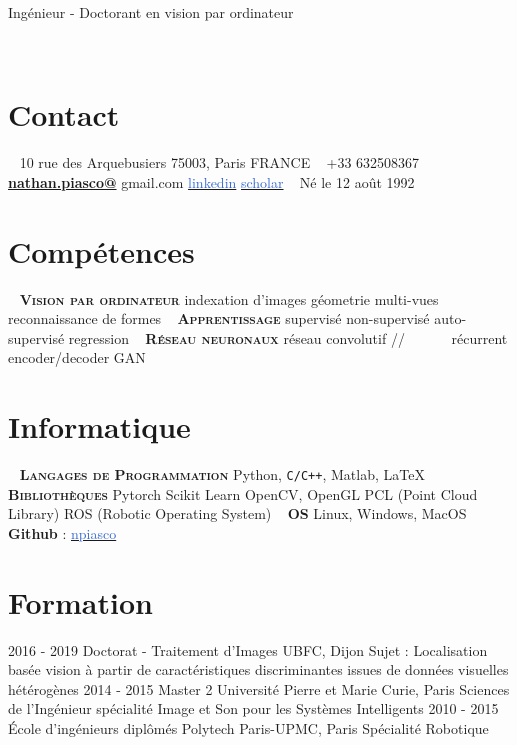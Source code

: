 \documentclass[]{friggeri-cv-cust}
\begin{document}
      {Ingénieur - Doctorant en vision par ordinateur}
      
\vspace{10pt}
\vspace{1pt}

\begin{aside}
  ~
  \section{Contact}
    ~
    10 rue des Arquebusiers
    75003, Paris
    FRANCE
    ~
    +33 632508367
    ~
   	\href{mailto:nathan.piasco@gmail.com}{\textbf{nathan.piasco@}}
   	gmail.com
	{\href{https://www.linkedin.com/in/nathan-piasco-a4766aa5/}{\textcolor{highlight}{linkedin}}}
	{\href{https://scholar.google.fr/citations?user=S3zYmOYAAAAJ&hl=fr}{\textcolor{highlight}{scholar}}}
	~
    Né le 12 août 1992
    ~    
  \section{Compétences}
    ~
    \textbf{\small{\textsc{Vision par ordinateur}}}
    indexation d'images
    géometrie multi-vues
    reconnaissance de formes
    ~    
    \textbf{\small{\textsc{Apprentissage}}}
    supervisé
    non-supervisé
    auto-supervisé
    regression
    ~    
    \textbf{\small{\textsc{Réseau neuronaux}}}
    réseau convolutif
    //~~~~~~ récurrent
    encoder/decoder
    GAN
    ~    
  \section{Informatique}
    ~  
    \textbf{\textsc{\textsc{Langages de Programmation}}}
    Python, \texttt{C/C++},
    Matlab,  \LaTeX
    ~
    \textbf{\textsc{Bibliothèques}}
    Pytorch
    Scikit Learn
	OpenCV, OpenGL
    PCL (Point Cloud Library)
    ROS (Robotic Operating System)
    ~
    \textbf{\textsc{OS}}
    Linux, Windows, MacOS
    ~
    \textbf{{Github}} : {\href{https://github.com/npiasco}{\textcolor{highlight}{npiasco}}}
\end{aside}

\section{Formation}
\begin{entrylist}
  \entry
    {2016 - 2019}
    {Doctorat - Traitement d'Images}
    {UBFC, Dijon}
    {Sujet : Localisation basée vision à partir de caractéristiques discriminantes issues de données visuelles hétérogènes}
  \entry
    {2014 - 2015}
    {Master 2}
    {Universit\'e Pierre et Marie Curie, Paris}
    {Sciences de l'Ingénieur spécialité Image et Son pour les Systèmes Intelligents}
  \entry
    {2010 - 2015}
    {École d’ingénieurs diplômés}
    {Polytech Paris-UPMC, Paris}
    {Spécialité Robotique}
\end{entrylist}
\end{document}
